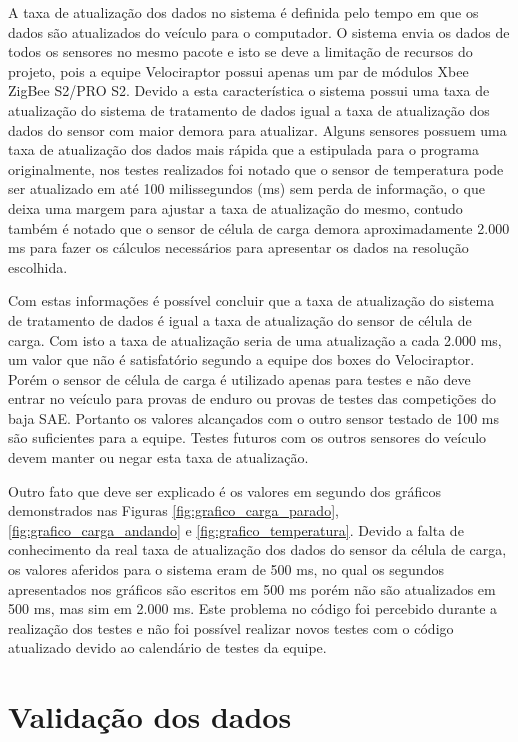 A taxa de atualização dos dados no sistema é definida pelo tempo em que os dados são atualizados do veículo para o computador. O sistema envia os dados de todos os sensores no mesmo pacote e isto se deve a limitação de recursos do projeto, pois a equipe Velociraptor possui apenas um par de módulos Xbee ZigBee S2/PRO S2. Devido a esta característica o sistema possui uma taxa de atualização do sistema de tratamento de dados igual a taxa de atualização dos dados do sensor com maior demora para atualizar. Alguns sensores possuem uma taxa de atualização dos dados mais rápida que a estipulada para o programa originalmente, nos testes realizados foi notado que o sensor de temperatura pode ser atualizado em até 100 milissegundos (ms) sem perda de informação, o que deixa uma margem para ajustar a taxa de atualização do mesmo, contudo também é notado que o sensor de célula de carga demora aproximadamente 2.000 ms para fazer os cálculos necessários para apresentar os dados na resolução escolhida.

Com estas informações é possível concluir que a taxa de atualização do sistema de tratamento de dados é igual a taxa de atualização do sensor de célula de carga. Com isto a taxa de atualização seria de uma atualização a cada 2.000 ms, um valor que não é satisfatório segundo a equipe dos boxes do Velociraptor. Porém o sensor de célula de carga é utilizado apenas para testes e não deve entrar no veículo para provas de enduro ou provas de testes das competições do baja SAE. Portanto os valores alcançados com o outro sensor testado de 100 ms são suficientes para a equipe. Testes futuros com os outros sensores do veículo devem manter ou negar esta taxa de atualização.

Outro fato que deve ser explicado é os valores em segundo dos gráficos demonstrados nas Figuras \ref{fig:grafico_carga_parado}, \ref{fig:grafico_carga_andando} e \ref{fig:grafico_temperatura}. Devido a falta de conhecimento da real taxa de atualização dos dados do sensor da célula de carga, os valores aferidos para o sistema eram de 500 ms, no qual os segundos apresentados nos gráficos são escritos em 500 ms porém não são atualizados em 500 ms, mas sim em 2.000 ms. Este problema no código foi percebido durante a realização dos testes e não foi possível realizar novos testes com o código atualizado devido ao calendário de testes da equipe.

\section{Validação dos dados}
\label{sec:validacao}

